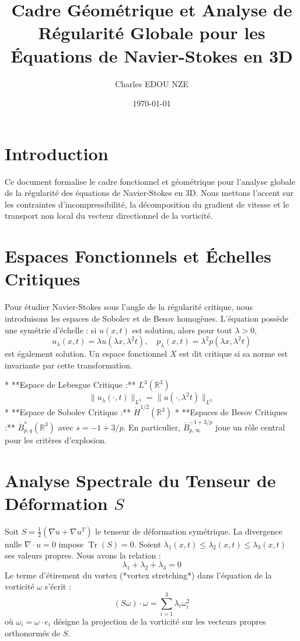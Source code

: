 \documentclass[11pt,a4paper]{article}
\title{Cadre Géométrique et Analyse de Régularité Globale pour les Équations de Navier-Stokes en 3D}
\author{Charles EDOU NZE}
\date{\today}
\begin{document}
\maketitle

\section{Introduction}
Ce document formalise le cadre fonctionnel et géométrique pour l'analyse globale de la régularité des équations de Navier-Stokes en 3D. Nous mettons l'accent sur les contraintes d'incompressibilité, la décomposition du gradient de vitesse et le transport non local du vecteur directionnel de la vorticité.

\section{Espaces Fonctionnels et Échelles Critiques}
Pour étudier Navier-Stokes sous l'angle de la régularité critique, nous introduisons les espaces de Sobolev et de Besov homogènes.
L'équation possède une symétrie d'échelle : si $u(x,t)$ est solution, alors pour tout $\lambda > 0$,
$$ u_\lambda(x,t) = \lambda u(\lambda x, \lambda^2 t), \quad p_\lambda(x,t) = \lambda^2 p(\lambda x, \lambda^2 t) $$
est également solution. Un espace fonctionnel $X$ est dit critique si sa norme est invariante par cette transformation.

* **Espace de Lebesgue Critique :** $L^3(\mathbb{R}^3)$
  $$ \|u_\lambda(\cdot, t)\|_{L^3} = \|u(\cdot, \lambda^2 t)\|_{L^3} $$
* **Espace de Sobolev Critique :** $\dot{H}^{1/2}(\mathbb{R}^3)$
* **Espaces de Besov Critiques :** $\dot{B}^{s}_{p,q}(\mathbb{R}^3)$ avec $s = -1 + 3/p$. En particulier, $\dot{B}^{-1+3/p}_{p,\infty}$ joue un rôle central pour les critères d'explosion.

\section{Analyse Spectrale du Tenseur de Déformation $S$}
Soit $S = \frac{1}{2}(\nabla u + \nabla u^T)$ le tenseur de déformation symétrique.
La divergence nulle $\nabla \cdot u = 0$ impose $\operatorname{Tr}(S) = 0$.
Soient $\lambda_1(x,t) \le \lambda_2(x,t) \le \lambda_3(x,t)$ ses valeurs propres. Nous avons la relation :
$$ \lambda_1 + \lambda_2 + \lambda_3 = 0 $$
Le terme d'étirement du vortex (*vortex stretching*) dans l'équation de la vorticité $\omega$ s'écrit :
$$ (S \omega) \cdot \omega = \sum_{i=1}^3 \lambda_i \omega_i^2 $$
où $\omega_i = \omega \cdot e_i$ désigne la projection de la vorticité sur les vecteurs propres orthonormés de $S$.
\end{document}
